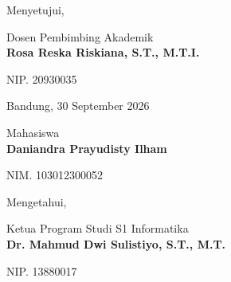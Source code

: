 \documentclass[12pt,a4paper]{article}
\begin{document}
\vspace{0.8cm}
\noindent
\begin{minipage}[t]{0.48\textwidth}
    \centering
    \phantom{Bandung, 30 September 2026}\par
    Menyetujui,\par
    Dosen Pembimbing Akademik\\[2.3cm]
    \textbf{Rosa Reska Riskiana, S.T., M.T.I.}\par
    NIP. 20930035
\end{minipage}
\hfill
\begin{minipage}[t]{0.48\textwidth}
    \centering
    Bandung, 30 September 2026\par
    \phantom{Menyetujui,}\par
    Mahasiswa\\[2.3cm]
    \textbf{Daniandra Prayudisty Ilham}\par
    NIM. 103012300052
\end{minipage}

\vspace{1.2cm}
\begin{center}
    Mengetahui,\par
    Ketua Program Studi S1 Informatika\\[2.3cm]
    \textbf{Dr. Mahmud Dwi Sulistiyo, S.T., M.T.}\par
    NIP. 13880017
\end{center}
\end{document}
